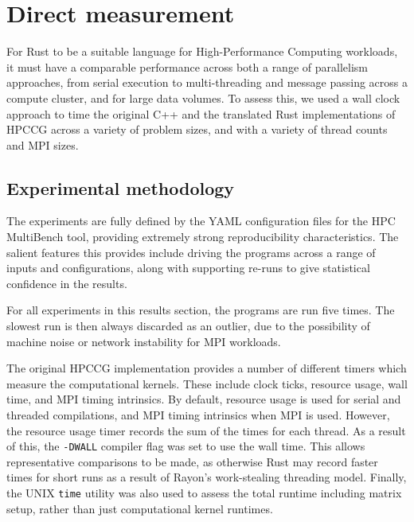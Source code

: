 \section{Direct measurement}
\label{sec:direct-measurement} %

For Rust to be a suitable language for High-Performance Computing workloads, it must have a comparable performance across both a range of parallelism approaches, from serial execution to multi-threading and message passing across a compute cluster, and for large data volumes. To assess this, we used a wall clock approach to time the original C++ and the translated Rust implementations of HPCCG across a variety of problem sizes, and with a variety of thread counts and MPI sizes.

\subsection{Experimental methodology}
\label{ssec:experimental-methodology}


The experiments are fully defined by the YAML configuration files for the HPC MultiBench tool, providing extremely strong reproducibility characteristics. The salient features this provides include driving the programs across a range of inputs and configurations, along with supporting re-runs to give statistical confidence in the results.

For all experiments in this results section, the programs are run five times. The slowest run is then always discarded as an outlier, due to the possibility of machine noise or network instability for MPI workloads.

The original HPCCG implementation provides a number of different timers which measure the computational kernels. These include clock ticks, resource usage, wall time, and MPI timing intrinsics. By default, resource usage is used for serial and threaded compilations, and MPI timing intrinsics when MPI is used. However, the resource usage timer records the sum of the times for each thread. As a result of this, the \texttt{-DWALL} compiler flag was set to use the wall time. This allows representative comparisons to be made, as otherwise Rust may record faster times for short runs as a result of Rayon's work-stealing threading model. Finally, the UNIX \texttt{time} utility was also used to assess the total runtime including matrix setup, rather than just computational kernel runtimes.

